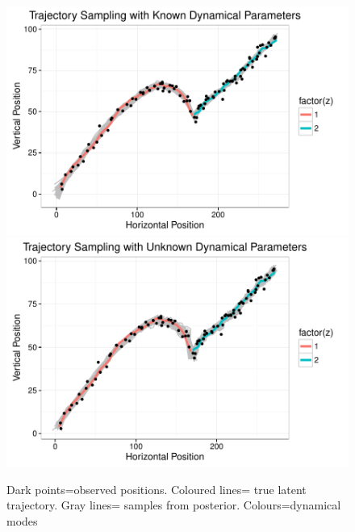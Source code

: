 \documentclass{article} %
\begin{document}
\begin{figure}
  \centering
  \includegraphics[width = \linewidth]{"./plot/lds/01_projectile_known"}
   \includegraphics[width = \linewidth]{"./plot/lds/02_projectile_unknown"}
   \caption{Dark points=observed positions. Coloured lines= true latent trajectory. Gray lines= samples from posterior. Colours=dynamical modes}
\end{figure}
\end{document}
